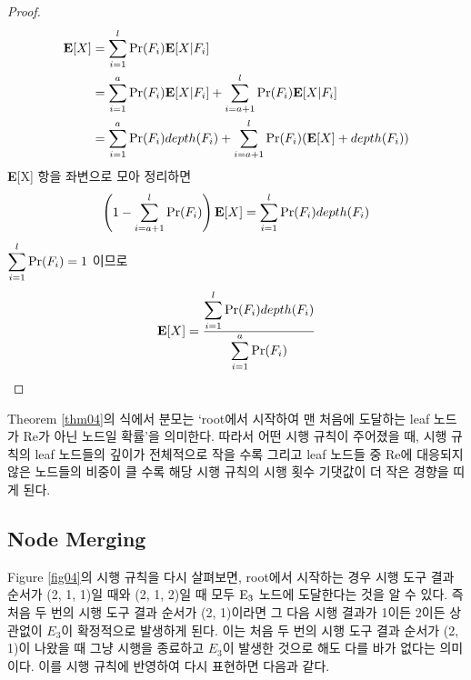 \documentclass[11pt]{article}
\begin{document}
\begin{proof}
\[
\begin{split}
\textbf{E}[X] & = \sum_{i=1}^{l} \textnormal{Pr}(F_{i}) \textbf{E}[X|F_{i}]\\
& = \sum_{i=1}^{a} \textnormal{Pr}(F_{i}) \textbf{E}[X|F_{i}] + \sum_{i=a+1}^{l} \textnormal{Pr}(F_{i}) \textbf{E}[X|F_{i}]\\
& = \sum_{i=1}^{a} \textnormal{Pr}(F_{i})depth(F_{i}) + \sum_{i=a+1}^{l} \textnormal{Pr}(F_{i})(\textbf{E}[X] + depth(F_{i}))\\
\end{split}
\]
\textbf{E}[X] 항을 좌변으로 모아 정리하면
\[\left(1 - \sum_{i=a+1}^{l} \textnormal{Pr}(F_{i})\right)\textbf{E}[X] = \sum_{i=1}^{l} \textnormal{Pr}(F_{i})depth(F_{i})\]
$\displaystyle \sum_{i=1}^{l} \textnormal{Pr}(F_{i}) = 1$ 이므로
\[\textbf{E}[X] = \frac{\displaystyle \sum_{i=1}^{l} \textnormal{Pr}(F_{i})depth(F_{i})}{\displaystyle \sum_{i=1}^{a} \textnormal{Pr}(F_{i})}\]
\end{proof}

Theorem \ref{thm04}의 식에서 분모는 `root에서 시작하여 맨 처음에 도달하는 leaf 노드가 Re가 아닌 노드일 확률'을 의미한다. 따라서 어떤 시행 규칙이 주어졌을 때, 시행 규칙의 leaf 노드들의 깊이가 전체적으로 작을 수록 그리고 leaf 노드들 중 Re에 대응되지 않은 노드들의 비중이 클 수록 해당 시행 규칙의 시행 횟수 기댓값이 더 작은 경향을 띠게 된다.

\subsection{Node Merging} \label{subsection3-4}
Figure \ref{fig04}의 시행 규칙을 다시 살펴보면, root에서 시작하는 경우 시행 도구 결과 순서가 (2, 1, 1)일 때와 (2, 1, 2)일 때 모두 $\textnormal{E}_{3}$ 노드에 도달한다는 것을 알 수 있다. 즉 처음 두 번의 시행 도구 결과 순서가 (2, 1)이라면 그 다음 시행 결과가 1이든 2이든 상관없이 $E_{3}$이 확정적으로 발생하게 된다. 이는 처음 두 번의 시행 도구 결과 순서가 (2, 1)이 나왔을 때 그냥 시행을 종료하고 $E_{3}$이 발생한 것으로 해도 다를 바가 없다는 의미이다. 이를 시행 규칙에 반영하여 다시 표현하면 다음과 같다.\\
\end{document}

